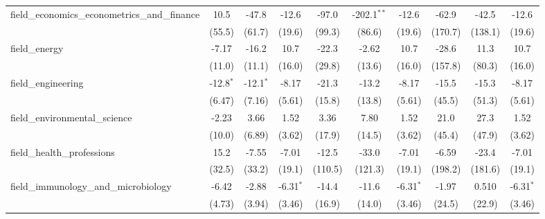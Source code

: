 \begin{tabular}{lccccccccc}
   field\_economics\_econometrics\_and\_finance                & 10.5          & -47.8         & -12.6         & -97.0          & -202.1$^{**}$ & -12.6         & -62.9   & -42.5     & -12.6\\   
                                                               & (55.5)        & (61.7)        & (19.6)        & (99.3)         & (86.6)        & (19.6)        & (170.7) & (138.1)   & (19.6)\\   
   field\_energy                                               & -7.17         & -16.2         & 10.7          & -22.3          & -2.62         & 10.7          & -28.6   & 11.3      & 10.7\\   
                                                               & (11.0)        & (11.1)        & (16.0)        & (29.8)         & (13.6)        & (16.0)        & (157.8) & (80.3)    & (16.0)\\   
   field\_engineering                                          & -12.8$^{*}$   & -12.1$^{*}$   & -8.17         & -21.3          & -13.2         & -8.17         & -15.5   & -15.3     & -8.17\\   
                                                               & (6.47)        & (7.16)        & (5.61)        & (15.8)         & (13.8)        & (5.61)        & (45.5)  & (51.3)    & (5.61)\\   
   field\_environmental\_science                               & -2.23         & 3.66          & 1.52          & 3.36           & 7.80          & 1.52          & 21.0    & 27.3      & 1.52\\   
                                                               & (10.0)        & (6.89)        & (3.62)        & (17.9)         & (14.5)        & (3.62)        & (45.4)  & (47.9)    & (3.62)\\   
   field\_health\_professions                                  & 15.2          & -7.55         & -7.01         & -12.5          & -33.0         & -7.01         & -6.59   & -23.4     & -7.01\\   
                                                               & (32.5)        & (33.2)        & (19.1)        & (110.5)        & (121.3)       & (19.1)        & (198.2) & (181.6)   & (19.1)\\   
   field\_immunology\_and\_microbiology                        & -6.42         & -2.88         & -6.31$^{*}$   & -14.4          & -11.6         & -6.31$^{*}$   & -1.97   & 0.510     & -6.31$^{*}$\\   
                                                               & (4.73)        & (3.94)        & (3.46)        & (16.9)         & (14.0)        & (3.46)        & (24.5)  & (22.9)    & (3.46)\\   

\end{tabular}
